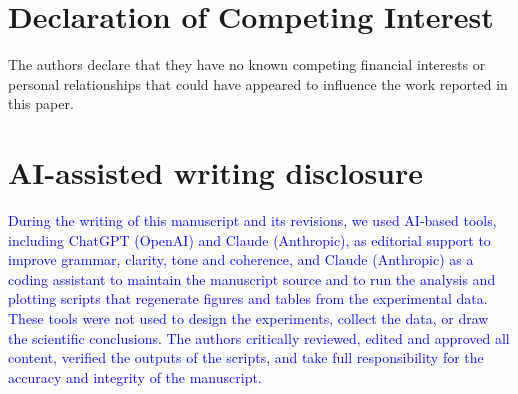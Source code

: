 \documentclass[preprint,12pt]{elsarticle}
\newcommand{\revblue}[1]{\textcolor{blue}{#1}}
\begin{document}
\section*{Declaration of Competing Interest}

The authors declare that they have no known competing financial interests or personal relationships that could have appeared to influence the work reported in this paper.

\section*{AI-assisted writing disclosure}

\revblue{During the writing of this manuscript and its revisions, we used AI-based tools, including ChatGPT (OpenAI) and Claude (Anthropic), as editorial support to improve grammar, clarity, tone and coherence, and Claude (Anthropic) as a coding assistant to maintain the manuscript source and to run the analysis and plotting scripts that regenerate figures and tables from the experimental data. These tools were not used to design the experiments, collect the data, or draw the scientific conclusions. The authors critically reviewed, edited and approved all content, verified the outputs of the scripts, and take full responsibility for the accuracy and integrity of the manuscript.}







%



\end{document}
